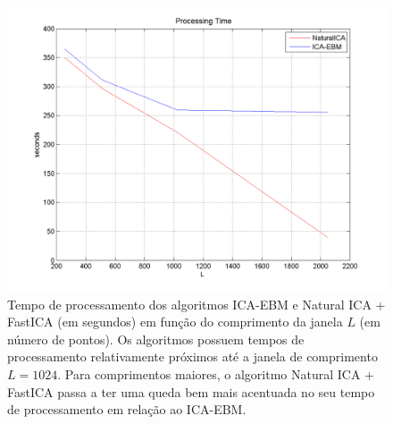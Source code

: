 \begin{figure}
    \centering
        \includegraphics[scale=0.5]{figuras/comparison_convergence_window.png}
            \caption{Tempo de processamento dos algoritmos ICA-EBM e Natural ICA + FastICA (em segundos) em função do comprimento da janela $L$ (em número de pontos). Os algoritmos possuem tempos de processamento relativamente próximos até a janela de comprimento $L=1024$. Para comprimentos maiores, o algoritmo Natural ICA + FastICA passa a ter uma queda bem mais acentuada no seu tempo de processamento em relação ao ICA-EBM.}
    \label{fig:comparison_convergence_window}
\end{figure}
